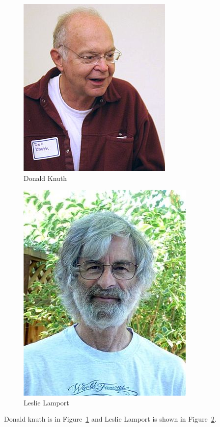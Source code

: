 \documentclass{article}  %
\begin{document}
 

\begin{figure}[ht]
\centering 
\includegraphics{Knuth.jpg}
\caption{{\Large Donald Knuth}}
\label{fig1}
\end{figure} 
 
 
 
\begin{figure}[h]
\centering 
\includegraphics{Lamport.jpg}
\caption{{\Large Leslie Lamport}}
\label{fig2}
\end{figure} 
 
Donald knuth is in Figure~\ref{fig1} and 
Leslie Lamport is shown in Figure~\ref{fig2}. 
 
\end{document}

